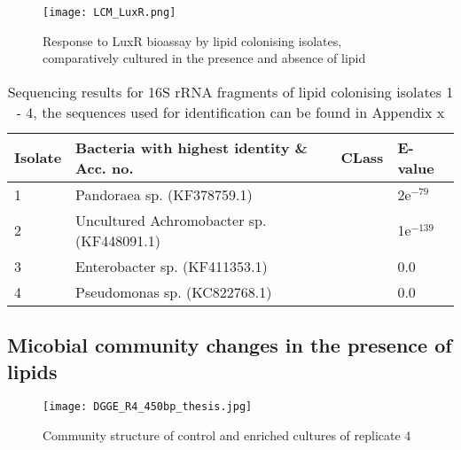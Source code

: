 \documentclass[11pt]{article}
\begin{document}
\begin{figure}
\texttt{[image: LCM\_LuxR.png]}
\caption{Response to LuxR bioassay by lipid colonising isolates, comparatively cultured in the presence and absence of lipid }
\end{figure}


\begin{sidewaystable}[!htbp]
\begin{tabular}{ | l | p{9cm} | p{4.5cm} | l | }
\hline
Isolate & Bacteria with highest identity \& Acc. no. & CLass & E-value \\
\hline
1 &  Pandoraea sp. (KF378759.1) &  & 2e$^{-79}$ \\
\hline
2 & Uncultured Achromobacter sp. (KF448091.1) &  & 1e$^{-139}$ \\
\hline
3 & Enterobacter sp. (KF411353.1) &   & 0.0 \\
\hline
4 & Pseudomonas sp. (KC822768.1) &  & 0.0 \\
\hline
\end{tabular}
\caption{Sequencing results for 16S rRNA fragments of lipid colonising isolates 1 - 4, the sequences used for identification can be found in Appendix x}
\end{sidewaystable}

\subsection{Micobial community changes in the presence of lipids}

\begin{figure}
\texttt{[image: DGGE\_R4\_450bp\_thesis.jpg]}
\caption{Community structure of control and enriched cultures of replicate 4}
\end{figure}
\end{document}
